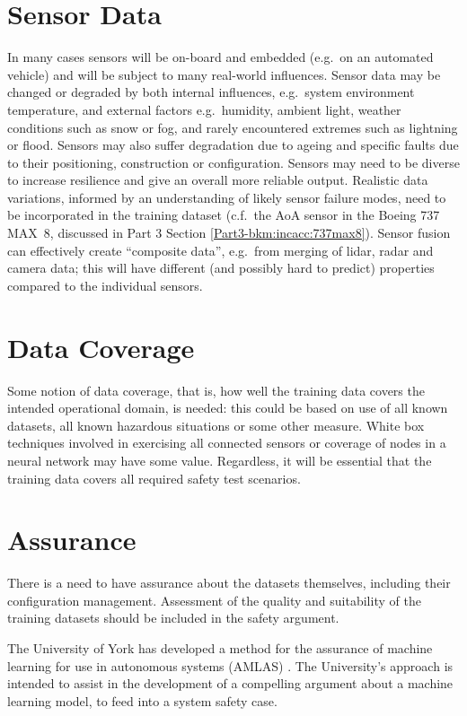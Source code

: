 \section{Sensor Data}
In many cases sensors will be on-board and embedded (e.g.\ on an automated vehicle) and will be subject to many real-world influences. Sensor data may be changed or degraded by both internal influences, e.g.\ system environment temperature, and external factors e.g.\ humidity, ambient light, weather conditions such as snow or fog, and rarely encountered extremes such as lightning or flood. 
Sensors may also suffer degradation due to ageing and specific faults due to their positioning, construction or configuration. Sensors may need to be diverse to increase resilience and give an overall more reliable output. Realistic data variations, informed by an understanding of likely sensor failure modes, need to be incorporated in the training \gls{dataset} (c.f.\ the AoA sensor in the Boeing 737 MAX~8, discussed in Part 3 Section \ref*{Part3-bkm:incacc:737max8}).
Sensor fusion can effectively create ``composite data'', e.g.\ from merging of lidar, radar and camera data; this will have different (and possibly hard to predict) properties compared to the individual sensors.

\section{Data Coverage}
Some notion of data coverage, that is, how well the training data covers the intended operational domain, is needed: this could be based on use of all known \glspl{dataset}, all known hazardous situations or some other measure. White box techniques involved in exercising all connected sensors or coverage of nodes in a neural network may have some value. Regardless, it will be essential that the training data covers all required safety test scenarios.

\section{ Assurance}
There is a need to have assurance about the \glspl{dataset} themselves, including their configuration management. Assessment of the quality and suitability of the training \glspl{dataset} should be included in the safety argument.

The University of York has developed a method for the assurance of machine learning for use in autonomous systems (AMLAS)
\cite{citation:machinelearning:amlas}.
The University's approach is intended to assist in the development of a compelling argument about a machine learning model,
to feed into a system safety case.

